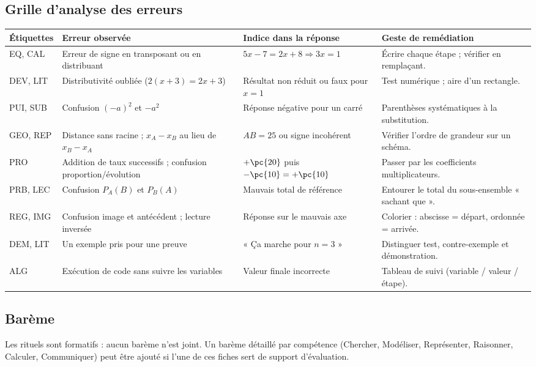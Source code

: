 \subsection*{Grille d'analyse des erreurs}
{\footnotesize{}
\begin{tabular}{@{}p{2.2cm} p{4.4cm} p{4.8cm} p{4.4cm}@{}}\toprule
Étiquettes & Erreur observée & Indice dans la réponse & Geste de remédiation \\ \midrule
EQ, CAL & Erreur de signe en transposant ou en distribuant & $5x-7=2x+8\Rightarrow3x=1$ & Écrire chaque étape ; vérifier en remplaçant. \\
DEV, LIT & Distributivité oubliée ($2(x+3)=2x+3$) & Résultat non réduit ou faux pour $x=1$ & Test numérique ; aire d'un rectangle. \\
PUI, SUB & Confusion $(-a)^2$ et $-a^2$ & Réponse négative pour un carré & Parenthèses systématiques à la substitution. \\
GEO, REP & Distance sans racine ; $x_A-x_B$ au lieu de $x_B-x_A$ & $AB=25$ ou signe incohérent & Vérifier l'ordre de grandeur sur un schéma. \\
PRO & Addition de taux successifs ; confusion proportion/évolution & $+\pc{20}$ puis $-\pc{10}=+\pc{10}$ & Passer par les coefficients multiplicateurs. \\
PRB, LEC & Confusion $P_A(B)$ et $P_B(A)$ & Mauvais total de référence & Entourer le total du sous-ensemble « sachant que ». \\
REG, IMG & Confusion image et antécédent ; lecture inversée & Réponse sur le mauvais axe & Colorier : abscisse = départ, ordonnée = arrivée. \\
DEM, LIT & Un exemple pris pour une preuve & « Ça marche pour $n=3$ » & Distinguer test, contre-exemple et démonstration. \\
ALG & Exécution de code sans suivre les variables & Valeur finale incorrecte & Tableau de suivi (variable / valeur / étape). \\ \bottomrule
\end{tabular}}

\subsection*{Barème}
Les rituels sont formatifs : aucun barème n'est joint. Un barème détaillé par compétence (Chercher, Modéliser, Représenter, Raisonner, Calculer, Communiquer) peut être ajouté si l'une de ces fiches sert de support d'évaluation.

